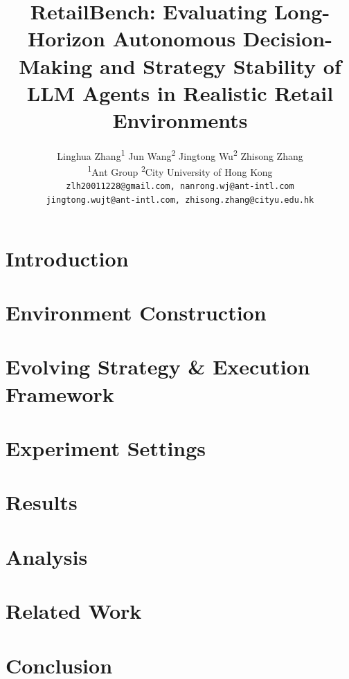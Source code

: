\documentclass[11pt]{article}
\title{RetailBench: Evaluating Long-Horizon Autonomous Decision-Making and Strategy Stability of LLM Agents in Realistic Retail Environments}
\author{
Linghua Zhang\textsuperscript{1}
\quad
Jun Wang\textsuperscript{2}
\quad
Jingtong Wu\textsuperscript{2}
\quad
Zhisong Zhang\textsuperscript{\dag} \\
\textsuperscript{1}Ant Group
\quad
\textsuperscript{2}City University of Hong Kong \\
\texttt{zlh20011228@gmail.com, nanrong.wj@ant-intl.com} \\
\texttt{jingtong.wujt@ant-intl.com, zhisong.zhang@cityu.edu.hk}
}
\begin{document}
\maketitle
\begin{abstract}

\end{abstract}

\section{Introduction}
\label{sec:intro}


\section{Environment Construction}
\label{sec:env}


\section{Evolving Strategy \& Execution Framework}
\label{sec:framework}


\section{Experiment Settings}
\label{sec:experiment}


\section{Results}
\label{sec:results}


\section{Analysis}
\label{sec:analysis}


\section{Related Work}
\label{sec:related_work}


\section{Conclusion}
\label{sec:conclusion}

\end{document}
